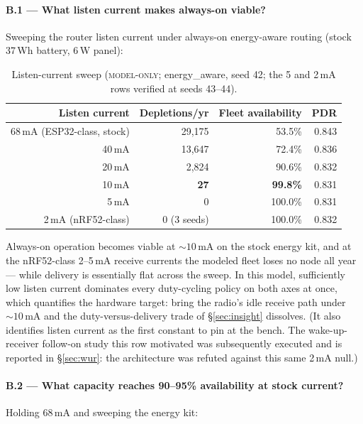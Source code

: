 \documentclass[11pt]{article}
\newcommand{\modelonly}{\textsc{model-only}}
\begin{document}
\paragraph{B.1 --- What listen current makes always-on viable?}
Sweeping the router listen current under always-on energy-aware routing
(stock 37\,Wh battery, 6\,W panel):

\begin{table}[h]
\centering\small
\begin{tabular}{@{}rrrr@{}}
\toprule
Listen current & Depletions/yr & Fleet availability & PDR \\
\midrule
68\,mA (ESP32-class, stock) & 29{,}175 & 53.5\% & 0.843 \\
40\,mA & 13{,}647 & 72.4\% & 0.836 \\
20\,mA & 2{,}824  & 90.6\% & 0.832 \\
10\,mA & \textbf{27} & \textbf{99.8\%} & 0.831 \\
5\,mA  & 0 & 100.0\% & 0.831 \\
2\,mA (nRF52-class) & 0 (3 seeds) & 100.0\% & 0.832 \\
\bottomrule
\end{tabular}
\caption{Listen-current sweep (\modelonly; energy\_aware, seed 42; the 5 and
2\,mA rows verified at seeds 43--44).}
\end{table}

Always-on operation becomes viable at ${\sim}10$\,mA on the stock energy kit,
and at the nRF52-class 2--5\,mA receive currents the modeled fleet loses no
node all year --- while delivery is essentially flat across the sweep. In this
model, sufficiently low listen current dominates every duty-cycling policy on
both axes at once, which quantifies the hardware target: bring the radio's
idle receive path under ${\sim}10$\,mA and the duty-versus-delivery trade of
\S\ref{sec:insight} dissolves. (It also identifies listen current as the
first constant to pin at the bench. The wake-up-receiver follow-on study
this row motivated was subsequently executed and is reported in
\S\ref{sec:wur}: the architecture was refuted against this same 2\,mA
null.)

\paragraph{B.2 --- What capacity reaches 90--95\% availability at stock current?}
Holding 68\,mA and sweeping the energy kit:
\end{document}
